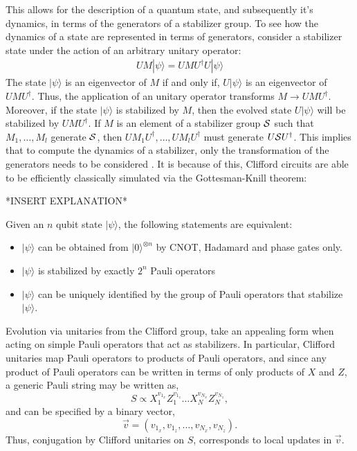 This allows for the description of a quantum state, and subsequently it's dynamics, in terms of the generators
of a stabilizer group. To see how the dynamics of a state are represented in terms of generators, consider
a stabilizer state under the action of an arbitrary unitary operator:
\begin{align}
    UM|\psi \rangle =  UMU^{\dagger}U|\psi\rangle
\end{align}
The state $|\psi \rangle$ is an eigenvector of $M$ if and only if, $U |\psi\rangle$ is an
eigenvector of $UMU^{\dagger}$. Thus, the application of an unitary operator transforms
$M \to UMU^{\dagger}$. Moreover, if the state $|\psi \rangle$ is stabilized by $M$, then the evolved
state $U|\psi\rangle$ will be stabilized by $UMU^{\dagger}$. If $M$ is an element of a stabilizer group
$\cal S$ such that $M_1, \dots, M_l$ generate $\cal S$, then $UM_1U^{\dagger}, \dots, UM_lU^{\dagger}$ must generate
$U{\cal S}U^{\dagger}$. This implies that to compute the dynamics of a stabilizer, only the transformation of
the generators needs to be considered \cite{fault-tolerantQC}. It is because of this,
Clifford circuits are able to be efficiently classically simulated via the Gottesman-Knill theorem:
\begin{theorem} *INSERT EXPLANATION*

    Given an $n$ qubit state $|\psi \rangle$, the following statements are equivalent:
    \begin{itemize}
        \item $|\psi \rangle$ can be obtained from $|0 \rangle^{\otimes n}$ by CNOT, Hadamard and phase gates only.
        \item $|\psi \rangle$ is stabilized by exactly $2^n$ Pauli operators
        \item $|\psi \rangle$ can be uniquely identified by the group of Pauli operators that
              stabilize $|\psi \rangle$.
    \end{itemize}
\end{theorem}
Evolution via unitaries from the Clifford group, take an appealing form when acting on simple Pauli operators that act as stabilizers.
In particular, Clifford unitaries map Pauli operators to products of Pauli operators, and since any product of Pauli operators
can be written in terms of only products of $X$ and $Z$, a generic Pauli string may be written as,
\begin{equation}
    S \propto X_1^{v_{1_x}}Z^{v_{1_z}}_1 \dots X_N^{v_{N_x}}Z^{v_{N_z}}_N,
\end{equation}
and can be specified by a binary vector,
\begin{equation}
    \vec{v} = (v_{1_x},  v_{1_z}, \dots, v_{N_x}, v_{N_z}).
\end{equation}
Thus, conjugation by Clifford unitaries on $S$, corresponds to local updates in $\vec{v}$.

